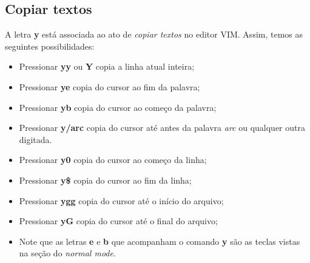 \documentclass[12pt]{article}
\begin{document}
	\subsection{Copiar textos}
	A letra \textbf{y} está associada ao ato de \emph{copiar textos} no editor VIM. Assim, temos as seguintes possibilidades:
	\begin{itemize}
		\item Pressionar \textbf{yy} ou \textbf{Y} copia a linha atual inteira;
		\item Pressionar \textbf{ye} copia do cursor ao fim da palavra;
		\item Pressionar \textbf{yb} copia do cursor ao começo da palavra;
		\item Pressionar \textbf{y/arc} copia do cursor até antes da palavra \emph{arc} ou qualquer outra digitada. 
		\item Pressionar \textbf{y0} copia do cursor ao começo da linha;
		\item Pressionar \textbf{y\$} copia do cursor ao fim da linha;
		\item Pressionar \textbf{ygg} copia do cursor até o início do arquivo;
		\item Pressionar \textbf{yG} copia do cursor até o final do arquivo;
		\item Note que as letras \textbf{e} e \textbf{b} que acompanham o comando \textbf{y} são as teclas vistas na seção do \emph{normal mode}.
	\end{itemize}
\end{document}
